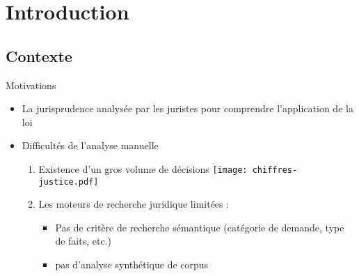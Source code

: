 \section{Introduction}

\subsection{Contexte}
\begin{frame}[c]{\mysubsectiontitle}
	Motivations
	\begin{itemize}
		\item La jurisprudence analysée par les juristes pour comprendre l'application de la loi 
	    \item Difficultés de l'analyse manuelle
	    \begin{enumerate}
	    	\item Existence d'un gros volume de décisions 
	    		\texttt{[image: chiffres-justice.pdf]}   	
			\item Les moteurs de recherche juridique limitées : 
			\begin{itemize}
				\item Pas de critère de recherche sémantique (catégorie de demande, type de faits, etc.)
				\item pas d'analyse synthétique de corpus
			\end{itemize}
	    \end{enumerate}
	\end{itemize}
\end{frame}

